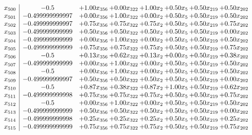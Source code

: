 \documentclass[8pt]{article}
\begin{document}
\[\begin{array}{c| c c@{\hskip 2pt} c@{\hskip 2pt} c@{\hskip 2pt} c@{\hskip 2pt} c@{\hskip 2pt} c@{\hskip 2pt} }
 x_{500}   &  -0.5 & +  1.00 x_{356} & +  0.00 x_{322} & +  1.00 x_{2} & +  0.50 x_{5} & +  0.50 x_{219} & +  0.50 x_{202}\\
 x_{501}   &  -0.499999999997 & +  0.00 x_{356} & +  1.00 x_{322} & +  0.00 x_{2} & +  0.50 x_{5} & +  0.50 x_{219} & +  0.50 x_{202}\\
 x_{502}   &  -0.499999999997 & +  0.75 x_{356} & +  0.75 x_{322} & +  0.75 x_{2} & +  0.50 x_{5} & +  0.50 x_{219} & +  0.75 x_{202}\\
 x_{503}   &  -0.499999999999 & +  0.50 x_{356} & +  0.50 x_{322} & +  0.50 x_{2} & +  0.50 x_{5} & +  0.50 x_{219} & +  0.00 x_{202}\\
 x_{504}   &  -0.499999999999 & +  0.00 x_{356} & +  1.00 x_{322} & +  0.00 x_{2} & +  0.50 x_{5} & +  0.50 x_{219} & +  0.50 x_{202}\\
 x_{505}   &  -0.499999999999 & +  0.75 x_{356} & +  0.75 x_{322} & +  0.75 x_{2} & +  0.50 x_{5} & +  0.50 x_{219} & +  0.75 x_{202}\\
 x_{506}   &  -0.5 & +  0.13 x_{356} & +  0.62 x_{322} & +  0.13 x_{2} & +  0.00 x_{5} & +  0.50 x_{219} & +  0.38 x_{202}\\
 x_{507}   &  -0.499999999999 & +  0.00 x_{356} & +  1.00 x_{322} & +  0.00 x_{2} & +  0.50 x_{5} & +  0.50 x_{219} & +  0.50 x_{202}\\
 x_{508}   &  -0.5 & +  0.00 x_{356} & +  1.00 x_{322} & +  0.00 x_{2} & +  0.50 x_{5} & +  0.50 x_{219} & +  0.50 x_{202}\\
 x_{509}   &  -0.499999999997 & +  0.50 x_{356} & +  0.50 x_{322} & +  0.50 x_{2} & +  0.50 x_{5} & +  0.50 x_{219} & +  0.00 x_{202}\\
 x_{510}   &  -0.5 & +  0.87 x_{356} & +  0.38 x_{322} & +  0.87 x_{2} & +  1.00 x_{5} & +  0.50 x_{219} & +  0.62 x_{202}\\
 x_{511}   &  -0.499999999998 & +  0.75 x_{356} & +  0.75 x_{322} & +  0.75 x_{2} & +  0.50 x_{5} & +  0.50 x_{219} & +  0.75 x_{202}\\
 x_{512}   &  -0.5 & +  0.00 x_{356} & +  1.00 x_{322} & +  0.00 x_{2} & +  0.50 x_{5} & +  0.50 x_{219} & +  0.50 x_{202}\\
 x_{513}   &  -0.499999999999 & +  0.50 x_{356} & +  0.50 x_{322} & +  0.50 x_{2} & +  0.50 x_{5} & +  0.50 x_{219} & +  0.00 x_{202}\\
 x_{514}   &  -0.499999999998 & +  0.25 x_{356} & +  0.25 x_{322} & +  0.25 x_{2} & +  0.50 x_{5} & +  0.50 x_{219} & +  0.25 x_{202}\\
 x_{515}   &  -0.499999999999 & +  0.75 x_{356} & +  0.75 x_{322} & +  0.75 x_{2} & +  0.50 x_{5} & +  0.50 x_{219} & +  0.75 x_{202}\\

\end{array}\]
\end{document}
